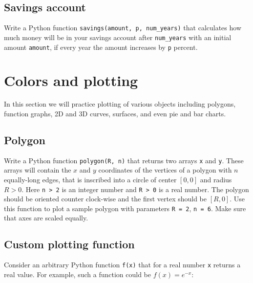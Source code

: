 \subsection{Savings account}

Write a Python function {\tt savings(amount, p, num\_years)} that calculates
how much money will be in your savings account after {\tt num\_years} with 
an initial amount {\tt amount}, if every year the amount increases by {\tt p}
percent.


\section{Colors and plotting}

In this section we will practice plotting of various objects including polygons, 
function graphs, 2D and 3D curves, surfaces, and even pie and bar charts. 


\subsection{Polygon}

Write a Python function {\tt polygon(R, n)} that returns two arrays {\tt x} and {\tt y}.
These arrays will contain the $x$ and $y$ coordinates of the vertices of a polygon 
with $n$ equally-long edges, that is inscribed into a circle of 
center $[0, 0]$ and radius $R > 0$. Here {\tt n > 2} is an integer number 
and {\tt R > 0} is a real number. The polygon should be oriented counter clock-wise
and the first vertex should be $[R, 0]$.
Use this function to plot a sample
polygon with parameters {\tt R = 2}, {\tt n = 6}. Make sure that axes are scaled equally.


\subsection{Custom plotting function}

Consider an arbitrary Python function {\tt f(x)} that for a real number 
{\tt x} returns a real value. For example, such a function could be 
$f(x) = e^{-x}$:

